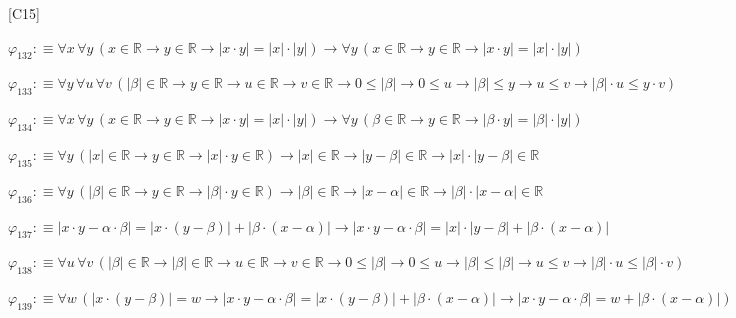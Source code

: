\begin{fullproof}{[C15]}
\begin{abbrevlist}
\item $\varphi_{132} :\equiv \forall x\,\forall y\,(x \in \mathbb{R} \to y \in \mathbb{R} \to \lvert x \cdot y \rvert = \lvert x \rvert \cdot \lvert y \rvert) \to \forall y\,(x \in \mathbb{R} \to y \in \mathbb{R} \to \lvert x \cdot y \rvert = \lvert x \rvert \cdot \lvert y \rvert)$
\item $\varphi_{133} :\equiv \forall y\,\forall u\,\forall v\,(\lvert \beta \rvert \in \mathbb{R} \to y \in \mathbb{R} \to u \in \mathbb{R} \to v \in \mathbb{R} \to 0 \leq \lvert \beta \rvert \to 0 \leq u \to \lvert \beta \rvert \leq y \to u \leq v \to \lvert \beta \rvert \cdot u \leq y \cdot v)$
\item $\varphi_{134} :\equiv \forall x\,\forall y\,(x \in \mathbb{R} \to y \in \mathbb{R} \to \lvert x \cdot y \rvert = \lvert x \rvert \cdot \lvert y \rvert) \to \forall y\,(\beta \in \mathbb{R} \to y \in \mathbb{R} \to \lvert \beta \cdot y \rvert = \lvert \beta \rvert \cdot \lvert y \rvert)$
\item $\varphi_{135} :\equiv \forall y\,(\lvert x \rvert \in \mathbb{R} \to y \in \mathbb{R} \to \lvert x \rvert \cdot y \in \mathbb{R}) \to \lvert x \rvert \in \mathbb{R} \to \lvert y - \beta \rvert \in \mathbb{R} \to \lvert x \rvert \cdot \lvert y - \beta \rvert \in \mathbb{R}$
\item $\varphi_{136} :\equiv \forall y\,(\lvert \beta \rvert \in \mathbb{R} \to y \in \mathbb{R} \to \lvert \beta \rvert \cdot y \in \mathbb{R}) \to \lvert \beta \rvert \in \mathbb{R} \to \lvert x - \alpha \rvert \in \mathbb{R} \to \lvert \beta \rvert \cdot \lvert x - \alpha \rvert \in \mathbb{R}$
\item $\varphi_{137} :\equiv \lvert x \cdot y - \alpha \cdot \beta \rvert = \lvert x \cdot (y - \beta) \rvert + \lvert \beta \cdot (x - \alpha) \rvert \to \lvert x \cdot y - \alpha \cdot \beta \rvert = \lvert x \rvert \cdot \lvert y - \beta \rvert + \lvert \beta \cdot (x - \alpha) \rvert$
\item $\varphi_{138} :\equiv \forall u\,\forall v\,(\lvert \beta \rvert \in \mathbb{R} \to \lvert \beta \rvert \in \mathbb{R} \to u \in \mathbb{R} \to v \in \mathbb{R} \to 0 \leq \lvert \beta \rvert \to 0 \leq u \to \lvert \beta \rvert \leq \lvert \beta \rvert \to u \leq v \to \lvert \beta \rvert \cdot u \leq \lvert \beta \rvert \cdot v)$
\item $\varphi_{139} :\equiv \forall w\,(\lvert x \cdot (y - \beta) \rvert = w \to \lvert x \cdot y - \alpha \cdot \beta \rvert = \lvert x \cdot (y - \beta) \rvert + \lvert \beta \cdot (x - \alpha) \rvert \to \lvert x \cdot y - \alpha \cdot \beta \rvert = w + \lvert \beta \cdot (x - \alpha) \rvert)$

\end{abbrevlist}
\end{fullproof}
